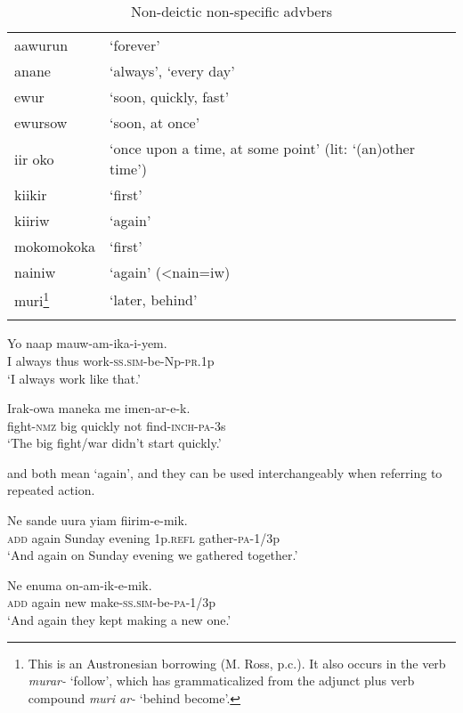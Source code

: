 \begin{table}
\begin{tabular}{ll}
\mytoprule
aawurun &`forever'\\
anane &`always', `every day'\\
ewur &`soon, quickly, fast'\\
ewursow &`soon, at once'\\
iir oko &`once upon a time, at some point' (lit: `(an)other time')\\
kiikir &`first'\\
kiiriw &`again'\\
mokomokoka &`first'\\
nainiw &`again' ({{\textless}}nain=iw)\\
muri\footnote{This is an Austronesian borrowing (M. Ross, p.c.). It also occurs in the verb \textit{murar-} `follow', which has grammaticalized from the adjunct plus verb compound \textit{muri ar-} `behind become'.} &`later, behind'\\
\mybottomrule 
\end{tabular}
\caption{Non-deictic non-specific advbers}
\label{tab:3:nondeicticnonspecific}
\end{table}

\ea%
\label{ex:3:x502}
\gll Yo  naap mauw-am-ika-i-yem. \\
I always thus work-\textsc{ss}.\textsc{sim}-be-Np-\textsc{pr}.1p\\
\glt`I always work like that.'
\z

\ea%
\label{ex:3:x504}
\gll Irak-owa maneka  me imen-ar-e-k. \\
fight-\textsc{nmz} big quickly not find-\textsc{inch}-\textsc{pa}-3s\\
\glt`The big fight/war didn't start quickly.'
\z

 and  both mean `again', and they can be used interchangeably when referring to repeated action.

\ea%
\label{ex:3:x697}
\gll Ne  sande uura yiam fiirim-e-mik. \\
\textsc{add} again Sunday evening 1p.\textsc{refl} gather-\textsc{pa}-1/3p\\
\glt`And again on Sunday evening we gathered together.'
\z

\ea%
\label{ex:3:x1762}
\gll Ne  enuma on-am-ik-e-mik. \\
\textsc{add} again new make-\textsc{ss}.\textsc{sim}-be-\textsc{pa}-1/3p\\
\glt`And again they kept making a new one.'
\z

